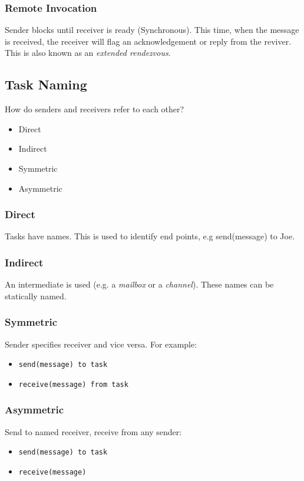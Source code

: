 \documentclass{article}
\begin{document}
\subsubsection{Remote Invocation}
\label{sec:org71f589c}
Sender blocks until receiver is ready (Synchronous).
This time, when the message is received, the receiver will flag an acknowledgement or reply from the reviver.
This is also known as an \emph{extended rendezvous}.

\subsection{Task Naming}
\label{sec:org6515bf2}
How do senders and receivers refer to each other?
\begin{itemize}
\item Direct
\item Indirect
\item Symmetric
\item Asymmetric
\end{itemize}
\subsubsection{Direct}
\label{sec:orgdb9523f}
Tasks have names.
This is used to identify end points, e.g send(message) to Joe.
\subsubsection{Indirect}
\label{sec:org8516f61}
An intermediate is used (e.g. a \emph{mailbox} or a \emph{channel}).
These names can be statically named.
\subsubsection{Symmetric}
\label{sec:org48df0a6}
Sender specifies receiver and vice versa.
For example:
\begin{itemize}
\item \texttt{send(message) to task}
\item \texttt{receive(message) from task}
\end{itemize}
\subsubsection{Asymmetric}
\label{sec:orgbd3a5d0}
Send to named receiver, receive from any sender:
\begin{itemize}
\item \texttt{send(message) to task}
\item \texttt{receive(message)}
\end{itemize}
\end{document}

